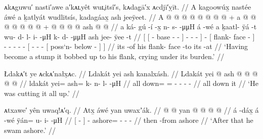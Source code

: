 \ex\label{ex:91-241-become-stump-bobbed}%
%
\begingl
	\glpreamble	ᴀkᴀguwu′ nasti′awe a′kᴀʟyêt wuʟ̣itsî′s, kᴀdag̣ā′x ᴀcdjī′ỵīt. //
	\glpreamble	A kagoowúx̱ nastée áwé a ḵatlyát wudlitsís, kadagáax̱ ash jeeÿeet. //
	\gla	{} {} A  @ {} @ {} @ {} {}
			 @ {} @ {} @ {} @ {} {}  @ {} +
		{} a  @ {} @ {} {}
		 @ {} @ {} @ {} @ {} @ {} +
		{}  @ {} @ {} @ {} @ {}
			{} ash  @ {} @ {} {} {} //
	\glb	{} {} a ká- gú -í -x̱ {}
			n- s-  -μμH {} {} á -wé
		{} a ḵaatl- ÿá -t {}
		wu- d- l- i-  -μH
		{} k- d-  -μμH {}
			{} ash jee- ÿee -t {} {} //
	\glc	{}[ {}[  - base - - {}]
			- -  - \· {}]
		 -
		{}[  flank- face - {}]
		- - - -  -
		{}[ - -  - \·
			{}[  poss‘n- below - {}] {}] //
	\gld	{} {} its  {} {} -of {}
			 {} {} {} {} {}  {}
		{} his flank- face -to {}
		 {} {} {} {} {}
		{}  {} {} {} {}
			{} its  {} -at {} {} //
	\glft	‘Having become a stump it bobbed up to his flank, crying under its burden.’
		//
\endgl
\xe


\ex\label{ex:91-242-cutting-all-up}%
%
\begingl
	\glpreamble	Łdakᴀ′t ye ᴀckᴀ′nałx̣ᴀc. //
	\glpreamble	Ldakát yei ash kanalxásh. //
	\gla	Ldakát yei @ ash @  @ {} @ {} @ {} @ {} //
	\glb	ldakát yei= ash= k- n- l-  -μH //
	\glc	all down= = - - -  - //
	\gld	all down it  {} {} {} {} //
	\glft	‘He was cutting it all up.’
		//
\endgl
\xe

\ex\label{ex:91-243-swam-ashore}%
%
\begingl
	\glpreamble	ᴀtxawe′ yên uwaq!ᴀ′q. //
	\glpreamble	Atx̱ áwé yan uwaxʼák. //
	\gla	{}  @ {} {}  @ {}
		yan @  @ {} @ {} @ {} //
	\glb	{} á -dáx̱ {} á -wé
		ÿán= u- i-  -μH //
	\glc	{}[  - {}]  -
		ashore= - -  - //
	\gld	{} then -from {}  {}
		ashore  {} {} {} //
	\glft	‘After that he swam ashore.’
		//
\endgl
\xe

